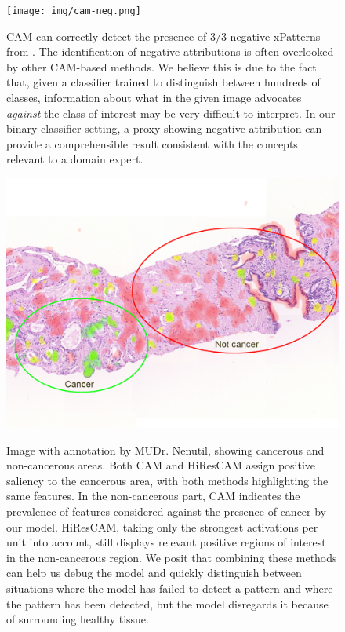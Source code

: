 \begin{figure}
    \begin{center}
    \begin{minipage}{0.8\textwidth}
      {\texttt{[image: img/cam-neg.png]}}
    \end{minipage}
    \caption{
    CAM can correctly detect the presence of $3/3$ negative xPatterns from \cite{gallo}.
    The identification of negative attributions is often overlooked by other CAM-based methods.
    We believe this is due to the fact that, given a classifier trained to distinguish between hundreds of classes, information about what in the given image advocates \emph{against} the class of interest may be very difficult to interpret.
    In our binary classifier setting, a proxy showing negative attribution can provide a comprehensible result consistent with the concepts relevant to a domain expert.
    }
    \label{fig:cam-neg}
    \end{center}
\end{figure}

\begin{figure}
    \centering
      {\includegraphics[width=\textwidth]{img/ruda-annot.png}}
    \caption{
    Image with annotation by MUDr. Nenutil, showing cancerous and non-cancerous areas.
    Both CAM and HiResCAM assign positive saliency to the cancerous area, with both methods highlighting the same features.
    In the non-cancerous part, CAM indicates the prevalence of features considered against the presence of cancer by our model.
    HiResCAM, taking only the strongest activations per unit into account, still displays relevant positive regions of interest in the non-cancerous region.
    We posit that combining these methods can help us debug the model and quickly distinguish between situations where the model has failed to detect a pattern and where the pattern has been detected, but the model disregards it because of surrounding healthy tissue.
    }
    \label{fig:ruda-annot}
\end{figure}